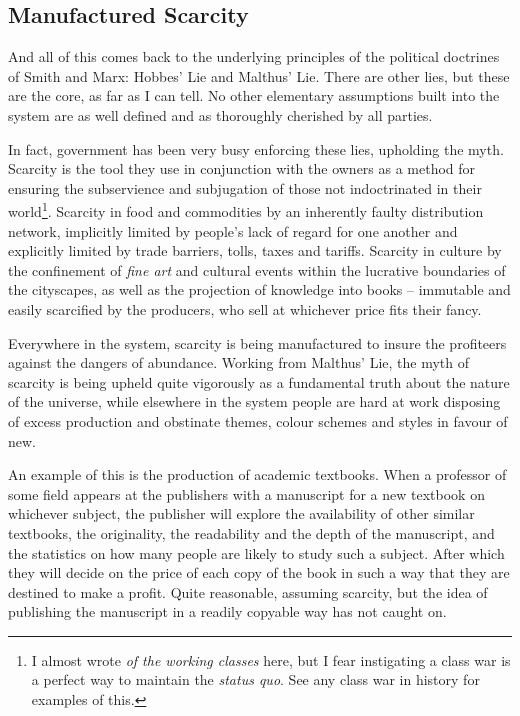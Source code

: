 \subsection{Manufactured Scarcity}
\label{s:artificial_scarcity:unspoken_mythology:manufactured_scarcity}

And all of this comes back to the underlying principles of the political
doctrines of Smith and Marx: Hobbes' Lie and Malthus' Lie. There are other 
lies, but these are the core, as far as I can tell. No other elementary
assumptions built into the system are as well def\hbox{}ined and as thoroughly
cherished by all parties.

In fact, government has been very busy enforcing these lies, upholding the 
myth.  Scarcity is the tool they use in conjunction with the owners as a method
for ensuring the subservience and subjugation of those not indoctrinated in
their world\footnote{I almost wrote \textit{of the working classes} here, but I
fear instigating a class war is a perfect way to maintain the \textit{status
quo}.  See any class war in history for examples of this.}. Scarcity in food 
and commodities by an inherently faulty distribution network, implicitly 
limited by people's lack of regard for one another and explicitly limited by
trade barriers, tolls, taxes and tarif\hbox{}fs. Scarcity in culture by the
conf\hbox{}inement of \textit{f\hbox{}ine art} and cultural events within the
lucrative boundaries of the cityscapes, as well as the projection of knowledge
into books – immutable and easily scarcif\hbox{}ied by the producers, who sell
at whichever price f\hbox{}its their fancy. 

Everywhere in the system, scarcity is being manufactured to insure the
prof\hbox{}iteers against the dangers of abundance. Working from Malthus' Lie,
the myth of scarcity is being upheld quite vigorously as a fundamental truth
about the nature of the universe, while elsewhere in the system people are hard
at work disposing of excess production and obstinate themes, colour schemes and
styles in favour of new.

An example of this is the production of academic textbooks. When a professor of
some f\hbox{}ield appears at the publishers with a manuscript for a new 
textbook on whichever subject, the publisher will explore the availability of
other similar textbooks, the originality, the readability and the depth of the
manuscript, and the statistics on how many people are likely to study such a
subject. After which they will decide on the price of each copy of the book in
such a way that they are destined to make a prof\hbox{}it. Quite reasonable,
assuming scarcity, but the idea of publishing the manuscript in a readily
copyable way has not caught on.

